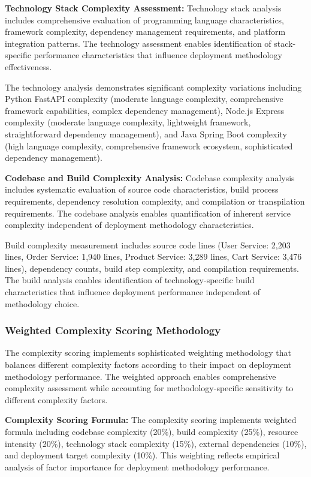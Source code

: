 \textbf{Technology Stack Complexity Assessment:}
Technology stack analysis includes comprehensive evaluation of programming language characteristics, framework complexity, dependency management requirements, and platform integration patterns. The technology assessment enables identification of stack-specific performance characteristics that influence deployment methodology effectiveness.

The technology analysis demonstrates significant complexity variations including Python FastAPI complexity (moderate language complexity, comprehensive framework capabilities, complex dependency management), Node.js Express complexity (moderate language complexity, lightweight framework, straightforward dependency management), and Java Spring Boot complexity (high language complexity, comprehensive framework ecosystem, sophisticated dependency management).

\textbf{Codebase and Build Complexity Analysis:}
Codebase complexity analysis includes systematic evaluation of source code characteristics, build process requirements, dependency resolution complexity, and compilation or transpilation requirements. The codebase analysis enables quantification of inherent service complexity independent of deployment methodology characteristics.

Build complexity measurement includes source code lines (User Service: 2,203 lines, Order Service: 1,940 lines, Product Service: 3,289 lines, Cart Service: 3,476 lines), dependency counts, build step complexity, and compilation requirements. The build analysis enables identification of technology-specific build characteristics that influence deployment performance independent of methodology choice.

\subsubsection{Weighted Complexity Scoring Methodology}

The complexity scoring implements sophisticated weighting methodology that balances different complexity factors according to their impact on deployment methodology performance. The weighted approach enables comprehensive complexity assessment while accounting for methodology-specific sensitivity to different complexity factors.

\textbf{Complexity Scoring Formula:}
The complexity scoring implements weighted formula including codebase complexity (20\%), build complexity (25\%), resource intensity (20\%), technology stack complexity (15\%), external dependencies (10\%), and deployment target complexity (10\%). This weighting reflects empirical analysis of factor importance for deployment methodology performance.

